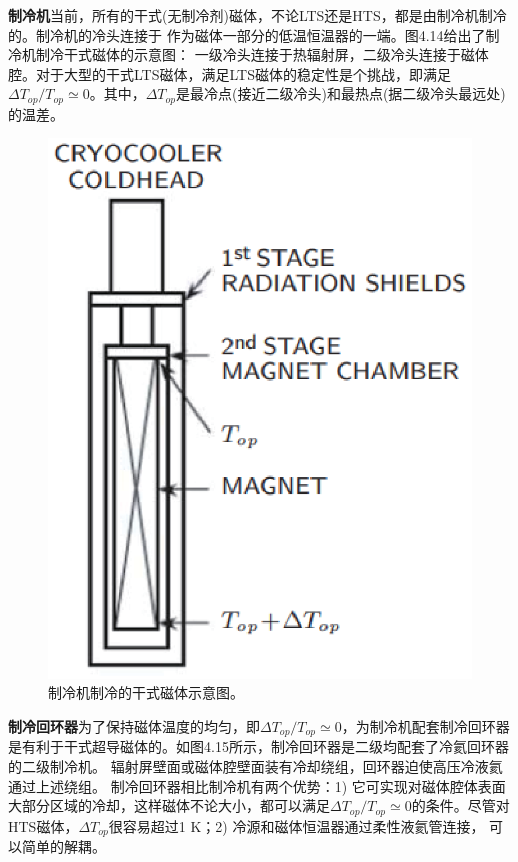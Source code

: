 \textbf{制冷机}\qquad 当前，所有的干式(无制冷剂)磁体，不论LTS还是HTS，都是由制冷机制冷的。制冷机的冷头连接于
作为磁体一部分的低温恒温器的一端。图4.14给出了制冷机制冷干式磁体的示意图：
一级冷头连接于热辐射屏，二级冷头连接于磁体腔。对于大型的干式LTS磁体，满足LTS磁体的稳定性是个挑战，即满足
$\Delta T_{op}/T_{op}\simeq 0$。其中，$\Delta T_{op}$是最冷点(接近二级冷头)和最热点(据二级冷头最远处)的温差。
\begin{figure}[htbp]
	\centering
	\includegraphics[scale=0.6]{chpt4/figs/fig4.14.eps}
	\caption{制冷机制冷的干式磁体示意图。}
\end{figure}

\textbf{制冷回环器}\qquad 为了保持磁体温度的均匀，即$\Delta T_{op}/T_{op}\simeq 0$，为制冷机配套制冷回环器
是有利于干式超导磁体的。如图4.15所示，制冷回环器是二级均配套了冷氦回环器的二级制冷机。
辐射屏壁面或磁体腔壁面装有冷却绕组，回环器迫使高压冷液氦通过上述绕组。
制冷回环器相比制冷机有两个优势：1) 它可实现对磁体腔体表面大部分区域的冷却，这样磁体不论大小，都可以满足$\Delta T_{op}/T_{op}\simeq 0$的条件。尽管对HTS磁体，$\Delta T_{op}$很容易超过1 K；2) 冷源和磁体恒温器通过柔性液氦管连接，
可以简单的解耦。

